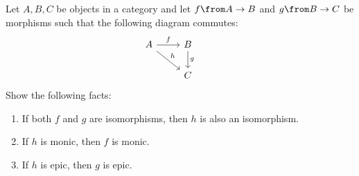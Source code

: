 \exercisesOnly{\newpage}

\begin{exercise}
  Let $A, B, C$ be objects in a category and let $f \from A \to B$ and $g \from B \to C$ be morphisms such that the following diagram commutes:
  \[
    \begin{tikzcd}
      A \arrow{r}{f} \arrow{dr}{h} & B \arrow{d}{g} & \\
      & C &
    \end{tikzcd}
  \]
  Show the following facts:
  \begin{enumerate}
  \item If both $f$ and $g$ are isomorphisms, then $h$ is also an isomorphism.
  \item If $h$ is monic, then $f$ is monic.
  \item If $h$ is epic, then $g$ is epic.
  \end{enumerate}
\end{exercise}

